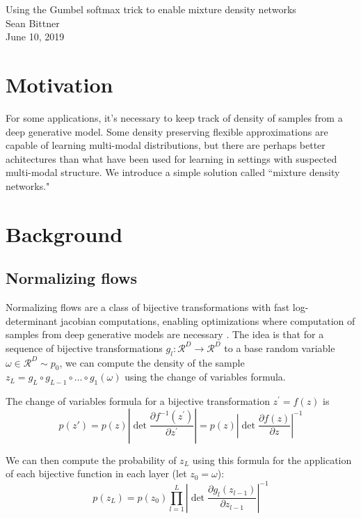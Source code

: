 \documentclass[11pt]{article}
\begin{document}
\medskip                        %

\thispagestyle{plain}
\begin{center}                  %
{\Large Using the Gumbel softmax trick to enable mixture density networks} \\
Sean Bittner \\
June 10, 2019 \\
\end{center}

\section{Motivation}
For some applications, it's necessary to keep track of density of samples from a deep generative model.  Some density preserving flexible approximations are capable of learning multi-modal distributions, but there are perhaps better achitectures than what have been used for learning in settings with suspected multi-modal structure.  We introduce a simple solution called ``mixture density networks."

\section{Background}
\subsection{Normalizing flows}
Normalizing flows are a class of bijective transformations with fast log-determinant jacobian computations, enabling optimizations where computation of samples from deep generative models are necessary
\cite{rezende2015variational}.  The idea is that for a sequence of bijective transformations $g_l : \mathcal{R}^D \rightarrow \mathcal{R}^D$ to a base random variable $\omega \in \mathcal{R}^D \sim p_0$, we can compute the density of the sample $z_L = g_L \circ g_{L-1} \circ ... \circ g_1(\omega)$ using the change of variables formula.

The change of variables formula for a bijective transformation $z^{'} = f(z)$ is
\[p(z') = p(z) \left| \det \frac{\partial f^{-1}(z^{'})}{\partial z^{'}} \right| = p(z) \left| \det \frac{\partial f(z)}{\partial z} \right|^{-1} \]

We can then compute the probability of $z_L$ using this formula for the application of each bijective function in each layer (let $z_0 = \omega$):
\[ p(z_L) = p(z_0) \prod_{l=1}^L \left| \det \frac{\partial g_l(z_{l-1})}{\partial z_{l-1}} \right|^{-1}  \]
\end{document}
